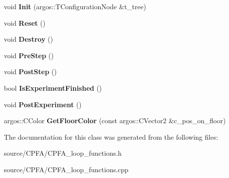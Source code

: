 \begin{DoxyCompactItemize}
\item 
\hypertarget{class_c_p_f_a__loop__functions_a97f6f1c4ac27f57f9d318d30f38ef1b9}{}void {\bfseries Init} (argos\+::\+T\+Configuration\+Node \&t\+\_\+tree)\label{class_c_p_f_a__loop__functions_a97f6f1c4ac27f57f9d318d30f38ef1b9}

\item 
\hypertarget{class_c_p_f_a__loop__functions_ac905a10128796e0bc1d2e7d8e5842dff}{}void {\bfseries Reset} ()\label{class_c_p_f_a__loop__functions_ac905a10128796e0bc1d2e7d8e5842dff}

\item 
\hypertarget{class_c_p_f_a__loop__functions_addb33071e767b219404c551f164c0445}{}void {\bfseries Destroy} ()\label{class_c_p_f_a__loop__functions_addb33071e767b219404c551f164c0445}

\item 
\hypertarget{class_c_p_f_a__loop__functions_a3495b36545b53118cc336be9e954a3ce}{}void {\bfseries Pre\+Step} ()\label{class_c_p_f_a__loop__functions_a3495b36545b53118cc336be9e954a3ce}

\item 
\hypertarget{class_c_p_f_a__loop__functions_a549dd30af6d26d0a080f801752a62e93}{}void {\bfseries Post\+Step} ()\label{class_c_p_f_a__loop__functions_a549dd30af6d26d0a080f801752a62e93}

\item 
\hypertarget{class_c_p_f_a__loop__functions_ad8fc7fe0e1b7c53c5071fa5745352c59}{}bool {\bfseries Is\+Experiment\+Finished} ()\label{class_c_p_f_a__loop__functions_ad8fc7fe0e1b7c53c5071fa5745352c59}

\item 
\hypertarget{class_c_p_f_a__loop__functions_a6841f721718a79cfca7866a9f010837f}{}void {\bfseries Post\+Experiment} ()\label{class_c_p_f_a__loop__functions_a6841f721718a79cfca7866a9f010837f}

\item 
\hypertarget{class_c_p_f_a__loop__functions_ae7dd1962bc63fe18ce9d27615154819a}{}argos\+::\+C\+Color {\bfseries Get\+Floor\+Color} (const argos\+::\+C\+Vector2 \&c\+\_\+pos\+\_\+on\+\_\+floor)\label{class_c_p_f_a__loop__functions_ae7dd1962bc63fe18ce9d27615154819a}

\end{DoxyCompactItemize}


The documentation for this class was generated from the following files\+:\begin{DoxyCompactItemize}
\item 
source/\+C\+P\+F\+A/C\+P\+F\+A\+\_\+loop\+\_\+functions.\+h\item 
source/\+C\+P\+F\+A/C\+P\+F\+A\+\_\+loop\+\_\+functions.\+cpp\end{DoxyCompactItemize}
